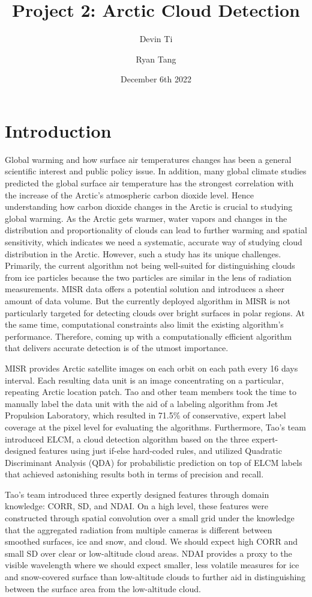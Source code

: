 \documentclass[11pt, letterpaper, journal]{IEEEtran}
\title{Project 2: Arctic Cloud Detection}
\author[1]{Devin Ti}
\author[1]{Ryan Tang}
\affil[1]{Duke University, Statistical Science}
\date{December 6th 2022}
\begin{document}
\maketitle

\section{Introduction}
Global warming and how surface air temperatures changes has been a general scientific interest and public policy issue. In addition, many global climate studies predicted the global surface air temperature has the strongest correlation with the increase of the Arctic's atmospheric carbon dioxide level. Hence understanding how carbon dioxide changes in the Arctic is crucial to studying global warming. As the Arctic gets warmer, water vapors and changes in the distribution and proportionality of clouds can lead to further warming and spatial sensitivity, which indicates we need a systematic, accurate way of studying cloud distribution in the Arctic. However, such a study has its unique challenges. Primarily, the current algorithm not being well-suited for distinguishing clouds from ice particles because the two particles are similar in the lens of radiation measurements. MISR data offers a potential solution and introduces a sheer amount of data volume. But the currently deployed algorithm in MISR is not particularly targeted for detecting clouds over bright surfaces in polar regions. At the same time, computational constraints also limit the existing algorithm's performance. Therefore, coming up with a computationally efficient algorithm that delivers accurate detection is of the utmost importance.

MISR provides Arctic satellite images on each orbit on each path every 16 days interval. Each resulting data unit is an image concentrating on a particular, repeating Arctic location patch. Tao and other team members took the time to manually label the data unit with the aid of a labeling algorithm from Jet Propulsion Laboratory, which resulted in 71.5\% of conservative, expert label coverage at the pixel level for evaluating the algorithms. Furthermore, Tao's team introduced ELCM, a cloud detection algorithm based on the three expert-designed features using just if-else hard-coded rules, and utilized Quadratic Discriminant Analysis (QDA) for probabilistic prediction on top of ELCM labels that achieved astonishing results both in terms of precision and recall.

Tao's team introduced three expertly designed features through domain knowledge: CORR, SD, and NDAI. On a high level, these features were constructed through spatial convolution over a small grid under the knowledge that the aggregated radiation from multiple cameras is different between smoothed surfaces, ice and snow, and cloud. We should expect high CORR and small SD over clear or low-altitude cloud areas. NDAI provides a proxy to the visible wavelength where we should expect smaller, less volatile measures for ice and snow-covered surface than low-altitude clouds to further aid in distinguishing between the surface area from the low-altitude cloud.
\end{document}
